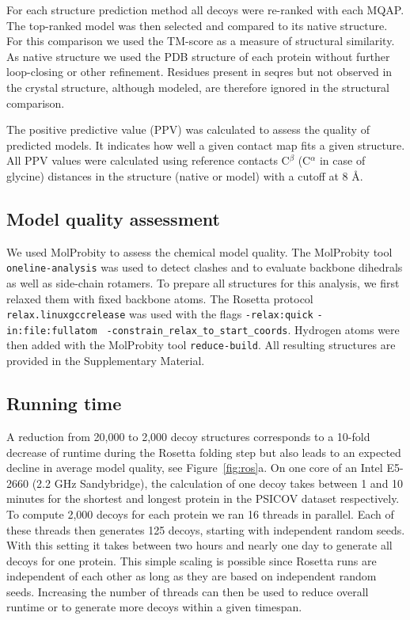 \documentclass{bioinfo}
\begin{document}
\begin{methods}
For each structure prediction method all decoys were re-ranked with
each MQAP. The top-ranked model was then selected and compared to its
native structure. For this comparison we used the TM-score
\cite[]{zhang_scoring_2004} as a measure of structural similarity. As
native structure we used the PDB structure of each protein without
further loop-closing or other refinement. Residues present in seqres
but not observed in the crystal structure, although modeled, are therefore ignored in the structural
comparison.

The positive predictive value (PPV) was calculated to assess the
quality of predicted models. It indicates how well a given contact map
fits a given structure. All PPV values were calculated using reference
contacts C$^{\beta}$ (C$^{\alpha}$ in case of glycine) distances in
the structure (native or model) with a cutoff at 8 \AA.


\subsection{Model quality assessment}

We used MolProbity \cite[]{chen_molprobity:_2010} to assess the chemical
model quality. The MolProbity tool {\tt oneline-analysis} was used to 
detect clashes and to evaluate backbone dihedrals as well as 
side-chain rotamers. To prepare all structures for this analysis, we 
first relaxed them with fixed backbone atoms.
The Rosetta protocol {\tt relax.linuxgccrelease} was used with the flags 
{\tt -relax:quick} {\tt -in:file:fullatom} {\tt 
-constrain\_relax\_to\_start\_coords}. Hydrogen atoms were then 
added with the MolProbity tool {\tt reduce-build}. All resulting 
structures are provided in the Supplementary Material.



\subsection{Running time}
A reduction from 20,000 to 2,000 decoy structures corresponds to a 10-fold
decrease of runtime during the Rosetta folding step but also leads to an
expected decline in average model quality{\color{red}, see Figure~\ref{fig:ros}a}. On one core of an Intel
E5-2660 (2.2 GHz Sandybridge), the calculation of one decoy takes
between 1 and 10 minutes for the shortest and longest protein in the
PSICOV dataset respectively. To compute 2,000 decoys for each protein
we ran 16 threads in parallel. Each of these threads then generates
125 decoys, starting with independent random seeds. With this setting
it takes between two hours and nearly one day to generate all decoys
for one protein. This simple scaling is possible since Rosetta runs
are independent of each other as long as they are based on 
independent random seeds. Increasing the number of threads can then be used to reduce
overall runtime or to generate more decoys within a given timespan.

\end{methods}
\end{document}
